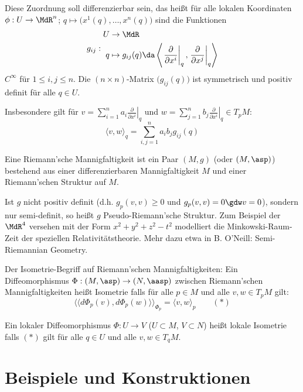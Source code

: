 \documentclass[a4paper,twoside,DIV15,BCOR12mm]{scrbook}
\begin{document}
Diese Zuordnung soll differenzierbar sein, das heißt für alle lokalen Koordinaten $\phi: U \to \MdR^n$; $q\mapsto \big(x^1(q), \ldots, x^n(q)\big)$ sind die Funktionen 
\[
g_{ij}:
\begin{aligned}
U &\to \MdR \\
q &\mapsto g_{ij}(q) \da \left\langle \left.\frac\partial{\partial x^i}\right|_q, \left.\frac\partial{\partial x^j}\right|_q\right\rangle
\end{aligned}
\]
$C^\infty$ für $1\le i,j\le n$. Die $(n\times n)$-Matrix $\big( g_{ij}(q)\big)$ ist symmetrisch und positiv definit für alle $q\in  U$.

Insbesondere gilt für $v = \sum_{i=1}^n a_i \left.\frac\partial{\partial x^i}\right|_q$ und $w = \sum_{j=1}^n b_j \left.\frac\partial{\partial x^i}\right|_q \in T_pM$:
\[ \langle v,w\rangle_q = \sum_{i,j=1}^n a_i b_j g_{ij}(q) \]

\begin{definition}
Eine Riemann’sche Mannigfaltigkeit ist ein Paar $(M,g)$ (oder $(M,\asp)$) bestehend aus einer differenzierbaren Mannigfaltigkeit $M$ und einer Riemann’schen Struktur auf $M$.
\end{definition}

\begin{bemerkung}
Ist $g$ nicht positiv definit (d.h. $g_p(v,v)\ge 0$ und $g_p(v,v) = 0 \gdw v=0$), sondern nur semi-definit, so heißt $g$ Pseudo-Riemann’sche Struktur. Zum Beispiel der $\MdR^4$ versehen mit der Form $x^2 + y^2 + z^2 - t^2$ modelliert die Minkowski-Raum-Zeit der speziellen Relativitätstheorie. Mehr dazu etwa in B. O’Neill: Semi-Riemannian Geometry.
\end{bemerkung}

Der Isometrie-Begriff auf Riemann’schen Mannigfaltigkeiten: Ein Diffeomorphismus $\Phi: (M,\asp) \to (N,\aasp)$ zwischen Riemann’schen Mannigfaltigkeiten heißt Isometrie falls für alle $p\in M$ und alle $v,w\in T_pM$ gilt:
\[ \langle\langle d\Phi_p(v), d\Phi_p(w) \rangle\rangle_{\Phi_{p}} = \langle v,w\rangle_p \qquad (*) \]

Ein lokaler Diffeomorphismus $\Phi: U \to V$ ($U\subset M$, $V\subset N$) heißt lokale Isometrie falls $(*)$ gilt für alle $q\in U$ und alle $v,w \in T_qM$.


\section{Beispiele und Konstruktionen}
\end{document}

